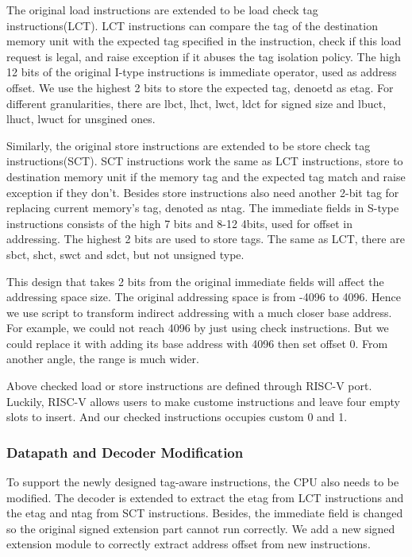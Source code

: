 \documentclass[conference]{IEEEtran}
\begin{document}
The original load instructions are extended to be load check tag instructions(LCT). LCT instructions can compare the tag of the destination memory unit with the expected tag specified in the instruction, check if this load request is legal, and raise exception if it abuses the tag isolation policy. The high 12 bits of the original I-type instructions is immediate operator, used as address offset. We use the highest 2 bits to store the expected tag, denoetd as etag. For different granularities, there are lbct, lhct, lwct, ldct for signed size and lbuct, lhuct, lwuct for unsgined ones.

Similarly, the original store instructions are extended to be store check tag instructions(SCT). SCT instructions work the same as LCT instructions, store to destination memory unit if the memory tag and the expected tag match and raise exception if they don't. Besides store instructions also need another 2-bit tag for replacing current memory's tag, denoted as ntag. The immediate fields in S-type instructions consists of the high 7 bits and 8-12 4bits, used for offset in addressing. The highest 2 bits are used to store tags. The same as LCT, there are sbct, shct, swct and sdct, but not unsigned type.

This design that takes 2 bits from the original immediate fields will affect the addressing space size. The original addressing space is from -4096 to 4096. Hence we use script to transform indirect addressing with a much closer base address. For example, we could not reach 4096 by just using check instructions. But we could replace it with adding its base address with 4096 then set offset 0. From another angle, the range is much wider.

Above checked load or store instructions are defined through RISC-V port. Luckily, RISC-V allows users to make custome instructions and leave four empty slots to insert. And our checked instructions occupies custom 0 and 1.


\subsubsection{Datapath and Decoder Modification}
To support the newly designed tag-aware instructions, the CPU also needs to be modified. The decoder is extended to extract the etag from LCT instructions and the etag and ntag from SCT instructions. Besides, the immediate field is changed so the original signed extension part cannot run correctly. We add a new signed extension module to correctly extract address offset from new instructions.
\end{document}
